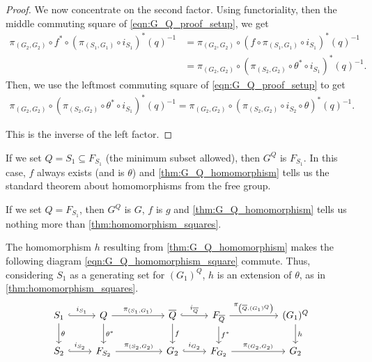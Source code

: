 \begin{proof}
	We now concentrate on the second factor.
	Using functoriality, then the middle commuting square of \eqref{eqn:G_Q_proof_setup}, we get
	\begin{align*}
		\pi_{(G_2,G_2)} \circ f^* \circ\left( \pi_{(S_1,G_1)} \circ i_{S_1}\right)^*(q)^{-1} & = \pi_{(G_2,G_2)} \circ \left( f \circ \pi_{(S_1,G_1)} \circ i_{S_1}\right)^*(q)^{-1}
		\\ &= \pi_{(G_2,G_2)} \circ \left(\pi_{(S_2,G_2)} \circ \theta^* \circ i_{S_1}\right)^*(q)^{-1}.
	\end{align*}
	Then, we use the leftmost commuting square of \eqref{eqn:G_Q_proof_setup} to get
	\begin{align*}
		\pi_{(G_2,G_2)} \circ \left(\pi_{(S_2,G_2)} \circ \theta^* \circ i_{S_1}\right)^*(q)^{-1} = \pi_{(G_2,G_2)} \circ \left(\pi_{(S_2,G_2)} \circ i_{S_2} \circ \theta \right)^*(q)^{-1}.
	\end{align*}

	This is the inverse of the left factor.
\end{proof}

\begin{remark}
	If we set $Q = S_1 \subseteq F_{S_1}$ (the minimum subset allowed), then  $G^Q$ is  $F_{S_1}$.
	In this case, $f$ always exists (and is  $\theta$) and \cref{thm:G_Q_homomorphism} tells us the standard theorem about homomorphisms from the free group.
\end{remark}

\begin{remark}
	If we set $Q = F_{S_1}$, then $G^Q$ is  $G$, $f$ is $g$ and \cref{thm:G_Q_homomorphism} tells us nothing more than  \cref{thm:homomorphism_squares}.
\end{remark}

\begin{corollary}
	The homomorphism $h$ resulting from \cref{thm:G_Q_homomorphism} makes the following diagram \eqref{eqn:G_Q_homomorphism_square} commute.
	Thus, considering $S_1$ as a generating set for  $(G_1)^Q$, $h$ is an extension of $\theta$, as in \cref{thm:homomorphism_squares}.
	\begin{equation}
		\begin{tikzcd}
			S_1 \ar[d, "\theta"] \ar[r, hook, "i_{S_1}"] & Q \ar[d, "\theta^*"] \ar[rr, "\pi_{(S_1, G_1)}"] & & \overline{Q} \ar[d, "f"] \ar[r, hook, "i_{\overline{Q}}"] & F_{\overline{Q}} \ar[d, "f^*"] \ar[rr, "\pi_{\left(\overline{Q}, (G_1)^Q\right)}"] & & (G_1)^Q \ar[d, "h"]
			\\ S_2 \ar[r, hook, "i_{S_2}"] & F_{S_2} \ar[rr, "\pi_{(S_2, G_2)}"] & & G_2 \ar[r, hook, "i_{G_2}"] & F_{G_2} \ar[rr, "\pi_{(G_2, G_2)}"] & & G_2
		\end{tikzcd}
		\label{eqn:G_Q_homomorphism_square}
	\end{equation}
\end{corollary}

